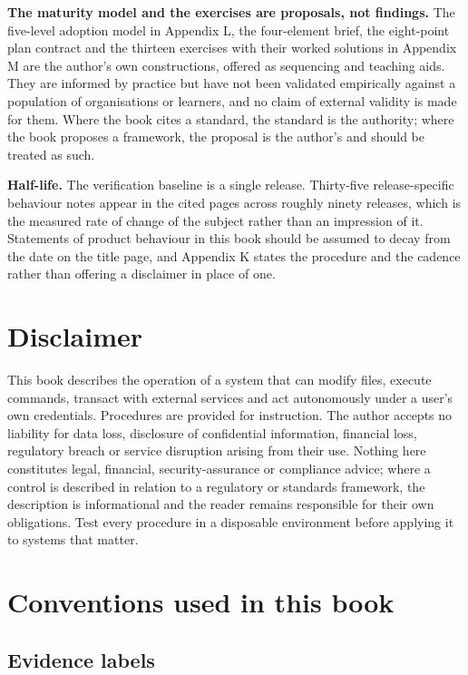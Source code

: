 \documentclass[11pt,a4paper,twoside,openany]{book}
\begin{document}
\textbf{The maturity model and the exercises are proposals, not findings.} The five-level adoption model in Appendix L, the four-element brief, the eight-point plan contract and the thirteen exercises with their worked solutions in Appendix M are the author's own constructions, offered as sequencing and teaching aids. They are informed by practice but have not been validated empirically against a population of organisations or learners, and no claim of external validity is made for them. Where the book cites a standard, the standard is the authority; where the book proposes a framework, the proposal is the author's and should be treated as such.


\textbf{Half-life.} The verification baseline is a single release. Thirty-five release-specific behaviour notes appear in the cited pages across roughly ninety releases, which is the measured rate of change of the subject rather than an impression of it. Statements of product behaviour in this book should be assumed to decay from the date on the title page, and Appendix K states the procedure and the cadence rather than offering a disclaimer in place of one.


\FloatBarrier
\section*{Disclaimer}

This book describes the operation of a system that can modify files, execute commands, transact with external services and act autonomously under a user's own credentials. Procedures are provided for instruction. The author accepts no liability for data loss, disclosure of confidential information, financial loss, regulatory breach or service disruption arising from their use. Nothing here constitutes legal, financial, security-assurance or compliance advice; where a control is described in relation to a regulatory or standards framework, the description is informational and the reader remains responsible for their own obligations. Test every procedure in a disposable environment before applying it to systems that matter.


\FloatBarrier
\section*{Conventions used in this book}

\subsection*{Evidence labels}
\end{document}
